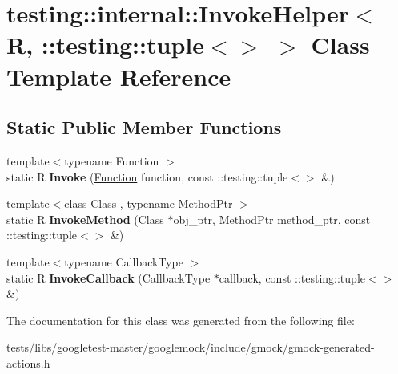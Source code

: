\hypertarget{classtesting_1_1internal_1_1InvokeHelper_3_01R_00_01_1_1testing_1_1tuple_3_4_01_4}{}\section{testing\+:\+:internal\+:\+:Invoke\+Helper$<$ R, \+:\+:testing\+:\+:tuple$<$$>$ $>$ Class Template Reference}
\label{classtesting_1_1internal_1_1InvokeHelper_3_01R_00_01_1_1testing_1_1tuple_3_4_01_4}
\subsection*{Static Public Member Functions}
\begin{DoxyCompactItemize}
\item 
\mbox{\label{classtesting_1_1internal_1_1InvokeHelper_3_01R_00_01_1_1testing_1_1tuple_3_4_01_4_a55e6218235e69a896d88a3076a2c6150}} 
{\footnotesize template$<$typename Function $>$ }\\static R {\bfseries Invoke} (\hyperlink{structtesting_1_1internal_1_1Function}{Function} function, const \+::testing\+::tuple$<$$>$ \&)
\item 
\mbox{\label{classtesting_1_1internal_1_1InvokeHelper_3_01R_00_01_1_1testing_1_1tuple_3_4_01_4_a0368e26cbc1bcb12abbfb802f8294fa0}} 
{\footnotesize template$<$class Class , typename Method\+Ptr $>$ }\\static R {\bfseries Invoke\+Method} (Class $\ast$obj\+\_\+ptr, Method\+Ptr method\+\_\+ptr, const \+::testing\+::tuple$<$$>$ \&)
\item 
\mbox{\label{classtesting_1_1internal_1_1InvokeHelper_3_01R_00_01_1_1testing_1_1tuple_3_4_01_4_a9d81d455ebad0e8bf02a7d04c07ccb20}} 
{\footnotesize template$<$typename Callback\+Type $>$ }\\static R {\bfseries Invoke\+Callback} (Callback\+Type $\ast$callback, const \+::testing\+::tuple$<$$>$ \&)
\end{DoxyCompactItemize}


The documentation for this class was generated from the following file\+:\begin{DoxyCompactItemize}
\item 
tests/libs/googletest-\/master/googlemock/include/gmock/gmock-\/generated-\/actions.\+h\end{DoxyCompactItemize}
